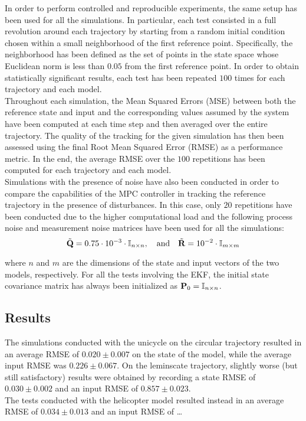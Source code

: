 \documentclass[../main.tex]{subfiles}
\begin{document}
In order to perform controlled and reproducible experiments, the same setup has
been used for all the simulations. In particular, each test consisted in a full
revolution around each trajectory by starting from a random initial condition
chosen within a small neighborhood of the first reference point. Specifically,
the neighborhood has been defined as the set of points in the state space whose
Euclidean norm is less than $0.05$ from the first reference point. In order to
obtain statistically significant results, each test has been repeated $100$
times for each trajectory and each model.\\
Throughout each simulation, the Mean Squared Errors (MSE) between both the
reference state and input 
and the corresponding values assumed by the system have been computed at each time step and then averaged over
the entire trajectory. The quality of the tracking for the given simulation has
then been assessed using the final Root Mean Squared Error (RMSE) as a
performance metric. In the end, the average RMSE over the $100$ repetitions has
been computed for each trajectory and each model.\\
Simulations with the presence of noise have also been conducted in order to
compare the capabilities of the MPC controller in tracking the reference
trajectory in the presence of disturbances. In this case, only $20$ repetitions
have been conducted due to the higher computational load and the following process
noise and measurement noise matrices have been used for all the simulations:
\begin{equation*}
	\tilde{\mathbf{Q}} = 0.75 \cdot 10^{-3} \cdot \mathbb{I}_{n \times n},
	\quad \text{and} \quad
	\tilde{\mathbf{R}} = 10^{-2} \cdot \mathbb{I}_{m \times m}
\end{equation*}

where $n$ and $m$ are the dimensions of the state and input vectors of the two
models, respectively. For all the tests involving the EKF, the initial state
covariance matrix has always been initialized as $\mathbf{P}_0 = \mathbb{I}_{n \times
n}$.

\pagebreak
\subsection{Results}




The simulations conducted with the unicycle on the circular trajectory resulted
in an average RMSE of $0.020 \pm 0.007$ on the state of the model, while the
average input RMSE was $0.226 \pm 0.067$. On the leminscate trajectory, slightly
worse (but still satisfactory) results were obtained by recording a state RMSE
of $0.030 \pm 0.002$ and an input RMSE of $0.857 \pm 0.023$.\\
The tests conducted with the helicopter model resulted instead in an average
RMSE of $0.034 \pm 0.013$ and an input RMSE of \dots
\end{document}
